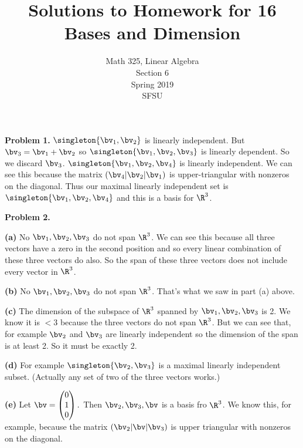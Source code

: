 \documentclass[oneside,12pt]{amsart}
\begin{document}
\title{Solutions to Homework for 16 \\ Bases and Dimension}
\author{Math 325, Linear Algebra \\ Section 6\\ Spring 2019 \\ SFSU }
\date{}

\maketitle

\textbf{Problem 1.} $\singleton{\bv_1,\bv_2}$ is linearly independent.
But $\bv_3 = \bv_1+\bv_2$ so $\singleton{\bv_1,\bv_2,\bv_3}$ is linearly
dependent. So we discard $\bv_3$. $\singleton{\bv_1,\bv_2,\bv_4}$ is linearly
independent. We can see this because the matrix
$\left(\bv_4 \vert \bv_2 \vert \bv_1 \right)$ is upper-triangular with
nonzeros on the diagonal. Thus our maximal linearly independent set is
$\singleton{\bv_1,\bv_2,\bv_4}$ and this is a basis for $\R^3$.

\bigskip

\textbf{Problem 2.}

\textbf{(a)} No $\bv_1,\bv_2,\bv_3$ do not span $\R^3$. We can see this because
all three vectors have a zero in the second position and so every linear combination
of these three vectors do also. So the span of these three vectors does not include
every vector in $\R^3$.

\bigskip



\textbf{(b)} No $\bv_1,\bv_2,\bv_3$ do not span $\R^3$. That's what we saw in part (a) above.

\bigskip


\textbf{(c)} The dimension of the subspace of $\R^3$ spanned by $\bv_1,\bv_2,\bv_3$ is 2.
We know it is $<3$ because the three vectors do not span $\R^3$. But we can see that,
for example $\bv_2$ and $\bv_3$ are linearly independent so the dimension of the
span is at least 2. So it must be exactly 2.

\bigskip


\textbf{(d)} For example $\singleton{\bv_2,\bv_3}$ is a maximal linearly independent subset.
(Actually any set of two of the three vectors works.)

\bigskip

\textbf{(e)} Let
$\bv =
\begin{pmatrix}
0 \\ 1 \\0
\end{pmatrix}.
$
Then $\bv_2,\bv_3,\bv$ is a basis fro $\R^3$. We know this, for example, because
the matrix $\left(\bv_2 \vert \bv \vert \bv_3 \right)$ is upper triangular with
nonzeros on the diagonal.
\end{document}
